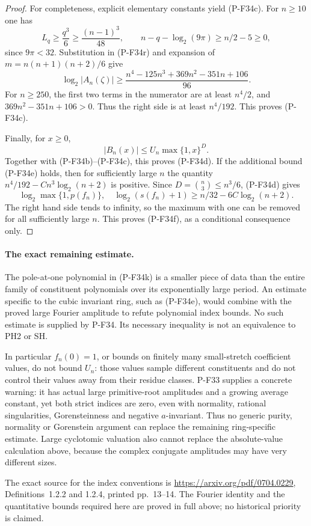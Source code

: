 \begin{proof}
For completeness, explicit elementary constants yield
(P-F34c). For $n\ge10$ one has
\[
 L_q\ge\frac{q^3}{6}\ge\frac{(n-1)^3}{48},\qquad
 n-q-\log_2(9\pi)\ge n/2-5\ge0,
\]
since $9\pi<32$. Substitution in (P-F34r) and expansion
of $m=n(n+1)(n+2)/6$ give
\[
 \log_2|A_n(\zeta)|
 \ge
 \frac{n^4-125n^3+369n^2-351n+106}{96}.
 \tag{P-F34s}
\]
For $n\ge250$, the first two terms in the numerator
are at least $n^4/2$, and
$369n^2-351n+106>0$. Thus the right side is at least
$n^4/192$. This proves (P-F34c).

Finally, for $x\ge0$,
\[
 |B_n(x)|\le U_n\max\{1,x\}^{D}.
\]
Together with (P-F34b)--(P-F34c), this proves
(P-F34d). If the additional bound (P-F34e) holds,
then for sufficiently large $n$ the quantity
$n^4/192-Cn^3\log_2(n+2)$ is positive. Since
$D=\binom n3\le n^3/6$, (P-F34d) gives
\[
 \log_2\max\{1,p(f_n)\},\quad\log_2(s(f_n)+1)
       \ge n/32-6C\log_2(n+2).
\]
The right hand side tends to infinity, so the maximum
with one can be removed for all sufficiently large
$n$. This proves (P-F34f), as a conditional consequence
only.
\end{proof}

\paragraph{The exact remaining estimate.}
The pole-at-one polynomial in (P-F34k) is a smaller
piece of data than the entire family of constituent
polynomials over its exponentially large period.
An estimate specific to the cubic invariant ring,
such as (P-F34e), would combine with the proved large
Fourier amplitude to refute polynomial index bounds.
No such estimate is supplied by P-F34. Its necessary
inequality is not an equivalence to PH2 or SH.

In particular $f_n(0)=1$, or bounds on finitely many
small-stretch coefficient values, do not bound $U_n$:
those values sample different constituents and do not
control their values away from their residue classes.
P-F33 supplies a concrete warning: it has actual large
primitive-root amplitudes and a growing average constant,
yet both strict indices are zero, even with normality,
rational singularities, Gorensteinness and negative
$a$-invariant. Thus no generic purity, normality or
Gorenstein argument can replace the remaining
ring-specific estimate. Large cyclotomic valuation
also cannot replace the absolute-value calculation
above, because the complex conjugate amplitudes may
have very different sizes.

The exact source for the index conventions is
\url{https://arxiv.org/pdf/0704.0229}, Definitions~1.2.2
and 1.2.4, printed pp.~13--14. The Fourier identity
and the quantitative bounds required here are proved
in full above; no historical priority is claimed.


